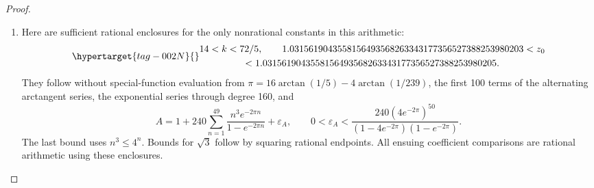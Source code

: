 \begin{proof}
\begin{enumerate}[label=\arabic*.,leftmargin=*]
\item Here are sufficient rational enclosures for the only nonrational
constants in this arithmetic:
\begin{equation}\hypertarget{tag-002N}{}\label{ari:eq:cc-constants}
 \begin{gathered}
 14<k<72/5,\qquad
 1.0315619043558156493568263343177356527388253980203
 <z_0\\
 <1.0315619043558156493568263343177356527388253980205.
 \end{gathered}
\end{equation}
They follow without special-function evaluation from
$\pi=16\arctan(1/5)-4\arctan(1/239)$, the first 100 terms
of the alternating arctangent series, the exponential series
through degree 160, and
\[
 A=1+240\sum_{n=1}^{49}\frac{n^3e^{-2\pi n}}{1-e^{-2\pi n}}
       +\varepsilon_A,\qquad
 0<\varepsilon_A<
 \frac{240(4e^{-2\pi})^{50}}
 {(1-4e^{-2\pi})(1-e^{-2\pi})}.
\]
The last bound uses $n^3\le4^n$. Bounds for $\sqrt3$ follow
by squaring rational endpoints. All ensuing coefficient
comparisons are rational arithmetic using these enclosures.


\end{enumerate}
\end{proof}
